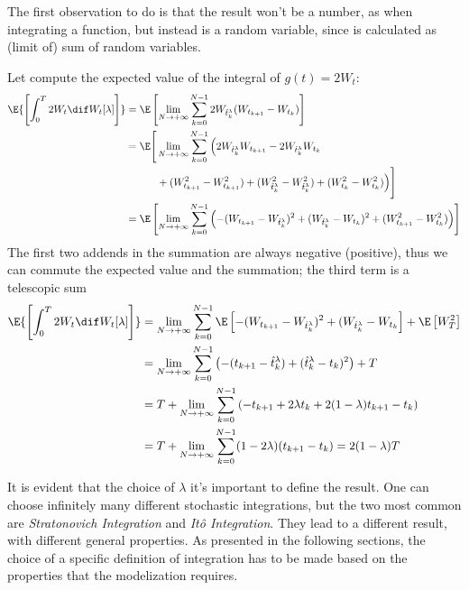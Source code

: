 The first observation to do is that the result won't be a number, as when 
integrating a function, but instead is a random variable, since is calculated as
(limit of) sum of random variables.
\begin{Example}
  Let compute the expected value of the integral of \(g{(t)}=2W_t\):
  \[\begin{split}
    \E{\left[\int_0^T 2W_t \dif W_t{[\lambda]}\right]}
      &= \E\left[\lim_{N\to+\infty} \sum_{k=0}^{N-1}2W_{\hat{t}_k^\lambda}(W_{t_{k+1}}-W_{t_k})\right] \\
      &= \E\Bigg[\lim_{N\to+\infty} \sum_{k=0}^{N-1}\Big(2W_{\hat{t}_k^\lambda}W_{t_{k+1}}-2W_{\hat{t}_k^\lambda}W_{t_k} \\
      & \qquad \quad         +(W^2_{t_{k+1}} - W^2_{t_{k+1}}) + (W^2_{\hat{t}_k^\lambda}-W^2_{\hat{t}_k^\lambda}) + (W^2_{t_k}-W^2_{t_k})\Big)\Bigg] \\
      &= \E\left[\lim_{N\to+\infty} \sum_{k=0}^{N-1}\left(-(W_{t_{k+1}}-W_{\hat{t}_k^\lambda})^2 + (W_{\hat{t}_k^\lambda}-W_{t_{k}})^2 + (W^2_{t_{k+1}} - W^2_{t_{k}}) \right)\right]
  \end{split}\]
  The first two addends in the summation are always negative (positive), thus we can commute
  the expected value and the summation; the third term is a telescopic sum
  \[\begin{split}
    \E{\left[\int_0^T 2W_t \dif W_t{[\lambda]}\right]}
      &= \lim_{N\to+\infty} \sum_{k=0}^{N-1}\E\left[-(W_{t_{k+1}}-W_{\hat{t}_k^\lambda})^2 + (W_{\hat{t}_k^\lambda}-W_{t_{k}}\right] + \E\left[W^2_{T}\right] \\
      &= \lim_{N\to+\infty} \sum_{k=0}^{N-1}\left(-(t_{k+1}-\hat{t}_k^\lambda) + (\hat{t}_k^\lambda-t_{k})^2\right) + T \\
      &= T + \lim_{N\to+\infty} \sum_{k=0}^{N-1}\left(-t_{k+1}+2\lambda t_k + 2(1-\lambda)t_{k+1}-t_k\right) \\
      &= T + \lim_{N\to+\infty} \sum_{k=0}^{N-1}(1-2\lambda)(t_{k+1}-t_k) = 2(1-\lambda)T
  \end{split}\]
\end{Example}
It is evident that the choice of \(\lambda\) it's important to define the result.
One can choose infinitely many different stochastic integrations, but the two most common
are \emph{Stratonovich Integration} and \emph{Itô Integration}. They lead to a different result,
with different general properties. As presented in the following sections, the choice of a specific
definition of integration has to be made based on the properties that the modelization requires.

